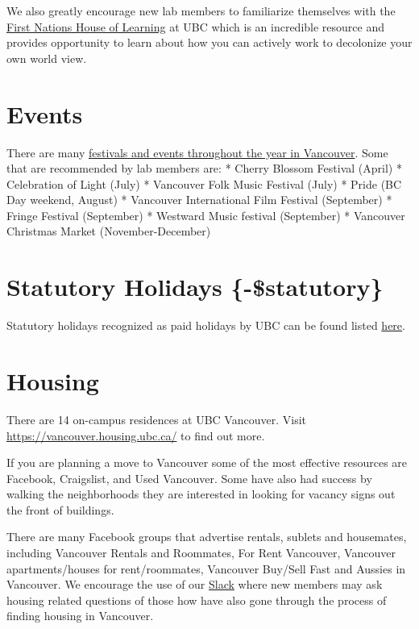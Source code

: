 \documentclass[
]{book}
\begin{document}
We also greatly encourage new lab members to familiarize themselves with the \href{https://indigenous.ubc.ca/longhouse/fnhl/}{First Nations House of Learning} at UBC which is an incredible resource and provides opportunity to learn about how you can actively work to decolonize your own world view.

\hypertarget{vancouverevents}{%
\section*{Events}\label{vancouverevents}}

There are many \href{https://www.destinationvancouver.com/events/calendar-of-events/}{festivals and events throughout the year in Vancouver}. Some that are recommended by lab members are:
* Cherry Blossom Festival (April)
* Celebration of Light (July)
* Vancouver Folk Music Festival (July)
* Pride (BC Day weekend, August)
* Vancouver International Film Festival (September)
* Fringe Festival (September)
* Westward Music festival (September)
* Vancouver Christmas Market (November-December)

\hypertarget{statutory-holidays--statutory}{%
\section{Statutory Holidays \{-\$statutory\}}\label{statutory-holidays--statutory}}

Statutory holidays recognized as paid holidays by UBC can be found listed \href{https://hr.ubc.ca/working-ubc/statutory-holidays}{here}.

\hypertarget{housing}{%
\section*{Housing}\label{housing}}

There are 14 on-campus residences at UBC Vancouver. Visit \url{https://vancouver.housing.ubc.ca/} to find out more.

If you are planning a move to Vancouver some of the most effective resources are Facebook, Craigslist, and Used Vancouver. Some have also had success by walking the neighborhoods they are interested in looking for vacancy signs out the front of buildings.

There are many Facebook groups that advertise rentals, sublets and housemates, including Vancouver Rentals and Roommates, For Rent Vancouver, Vancouver apartments/houses for rent/roommates, Vancouver Buy/Sell Fast and Aussies in Vancouver. We encourage the use of our \protect\hyperlink{slack}{Slack} where new members may ask housing related questions of those how have also gone through the process of finding housing in Vancouver.
\end{document}
